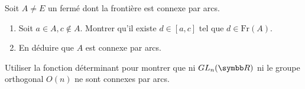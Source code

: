 \begin{exercice}
    Soit $A \neq E$ un fermé dont la frontière est connexe par arcs.
    \begin{enumerate}
        \item Soit $a \in A, c \notin A$. Montrer qu'il existe $d \in [a,c]$ tel que $d \in \text{Fr}(A)$.
        \item En déduire que $A$ est connexe par arcs.
    \end{enumerate}
\end{exercice}

\begin{exercice}
    Utiliser la fonction déterminant pour montrer que ni $GL_{n}(\R)$ 
    ni le groupe orthogonal $O(n)$ ne sont connexes par arcs.
\end{exercice}

\newpage
